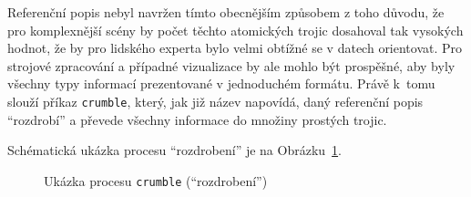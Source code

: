 \begin{enumerate}
	      Referenční popis nebyl navržen tímto obecnějším způsobem z toho důvodu, že pro komplexnější scény by počet těchto atomických trojic dosahoval tak vysokých hodnot,
	      že by pro lidského experta bylo velmi obtížné se v datech orientovat.
	      Pro strojové zpracování a případné vizualizace by ale mohlo být prospěšné, aby byly všechny typy informací prezentované v jednoduchém formátu.
	      Právě k~tomu slouží příkaz \texttt{crumble}, který, jak již název napovídá, daný referenční popis \enquote{rozdrobí} a převede všechny informace do množiny prostých trojic.

	      Schématická ukázka procesu \enquote{rozdrobení} je na Obrázku~\ref{fig:crumble_example}.
	      \begin{figure}[ht!]
		      \centering
		      \caption{Ukázka procesu \texttt{crumble} (\enquote{rozdrobení})}\label{fig:crumble_example}
	      \end{figure}


\end{enumerate}
